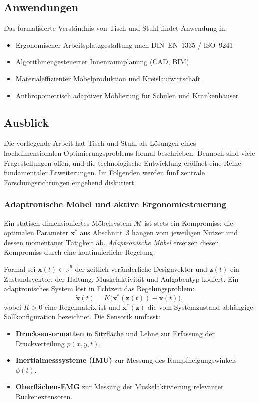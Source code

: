 ﻿\documentclass[a4paper,12pt]{article}
\theoremstyle{definition}
\begin{document}
\subsection{Anwendungen}

Das formalisierte Verst\"{a}ndnis von Tisch und Stuhl findet Anwendung in:
\begin{itemize}
	\item Ergonomischer Arbeitsplatzgestaltung nach DIN~EN~1335 / ISO~9241~\cite{DINEN1335, ISO9241}
	\item Algorithmengesteuerter Innenraumplanung (CAD, BIM)
	\item Materialeffizienter M\"{o}belproduktion und Kreislaufwirtschaft
	\item Anthropometrisch adaptiver M\"{o}blierung f\"{u}r Schulen und Krankenh\"{a}user
\end{itemize}

\subsection{Ausblick}

Die vorliegende Arbeit hat Tisch und Stuhl als L\"{o}sungen eines hochdimensionalen
Optimierungsproblems formal beschrieben. Dennoch sind viele Fragestellungen offen,
und die technologische Entwicklung er\"{o}ffnet eine Reihe fundamentaler Erweiterungen.
Im Folgenden werden f\"{u}nf zentrale Forschungsrichtungen eingehend diskutiert.

\subsubsection{Adaptronische M\"{o}bel und aktive Ergonomiesteuerung}

Ein statisch dimensioniertes M\"{o}belsystem $\mathcal{M}$ ist stets ein Kompromiss: die
optimalen Parameter $\mathbf{x}^*$ aus Abschnitt~3 h\"{a}ngen vom jeweiligen Nutzer und
dessen momentaner T\"{a}tigkeit ab. \emph{Adaptronische M\"{o}bel} ersetzen diesen
Kompromiss durch eine kontinuierliche Regelung.

Formal sei $\mathbf{x}(t) \in \mathbb{R}^6$ der zeitlich ver\"{a}nderliche Designvektor
und $\mathbf{z}(t)$ ein Zustandsvektor, der Haltung, Muskelaktivit\"{a}t und
Aufgabentyp kodiert. Ein adaptronisches System l\"{o}st in Echtzeit das
Regelungsproblem:
\[
	\dot{\mathbf{x}}(t) = K\bigl(\mathbf{x}^*(\mathbf{z}(t)) - \mathbf{x}(t)\bigr),
\]
wobei $K > 0$ eine Regelmatrix ist und $\mathbf{x}^*(\mathbf{z})$ die vom Systemzustand
abh\"{a}ngige Sollkonfiguration bezeichnet. Die Sensorik umfasst:
\begin{itemize}
	\item \textbf{Drucksensormatten} in Sitzfl\"{a}che und Lehne zur Erfassung der
	      Druckverteilung $p(x, y, t)$,
	\item \textbf{Inertialmesssysteme (IMU)} zur Messung des Rumpfneigungswinkels
	      $\phi(t)$,
	\item \textbf{Oberfl\"{a}chen-EMG} zur Messung der Muskelaktivierung relevanter
	      R\"{u}ckenextensoren.
\end{itemize}
\end{document}
